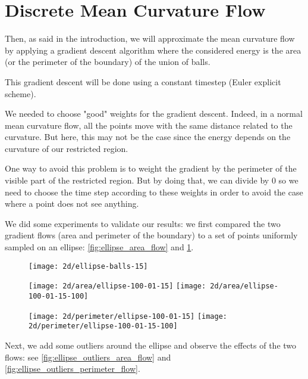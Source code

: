 \section{Discrete Mean Curvature Flow}

Then, as said in the introduction, we will approximate the mean curvature flow
by applying a gradient descent algorithm where the considered energy is the area
(or the perimeter of the boundary) of the union of balls.

This gradient descent will be done using a constant timestep (Euler explicit
scheme).

We needed to choose "good" weights for the gradient descent. Indeed, in a normal
mean curvature flow, all the points move with the same distance related to the
curvature. But here, this may not be the case since the energy depends on the
curvature of our restricted region.

One way to avoid this problem is to weight the gradient by the perimeter of the
visible part of the restricted region. But by doing that, we can divide by $ 0 $
so we need to choose the time step according to these weights in order to avoid
the case where a point does not see anything.


We did some experiments to validate our results: we first compared the two
gradient flows (area and perimeter of the boundary) to a set of points uniformly
sampled on an ellipse: \ref{fig:ellipse_area_flow} and
\ref{fig:ellipse_perimeter_flow}.

\begin{figure}[h]
    \centering

    \texttt{[image: 2d/ellipse-balls-15]}

    \texttt{[image: 2d/area/ellipse-100-01-15]}
    \texttt{[image: 2d/area/ellipse-100-01-15-100]}
    \label{fig:ellipse_area_flow}

    \texttt{[image: 2d/perimeter/ellipse-100-01-15]}
    \texttt{[image: 2d/perimeter/ellipse-100-01-15-100]}
    \label{fig:ellipse_perimeter_flow}
\end{figure}

Next, we add some outliers around the ellipse and observe the effects of the two
flows: see \ref{fig:ellipse_outliers_area_flow} and
\ref{fig:ellipse_outliers_perimeter_flow}.

